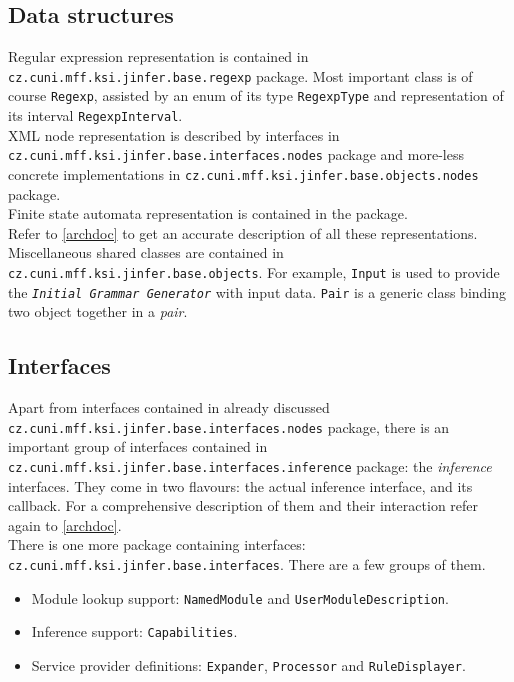 \documentclass[a4paper,10pt,oneside]{article}
\newcommand{\code}[1]{\texttt{#1}}
\newcommand{\jmodule}[1]{\texttt{\textit{#1}}}
\begin{document}
\subsection{Data structures}

Regular expression representation is contained in \code{cz.cuni.mff.ksi.jinfer.base.regexp} package. Most important class is of course \code{Regexp}, assisted by an enum of its type \code{RegexpType} and representation of its interval \code{RegexpInterval}.\\
XML node representation is described by interfaces in \code{cz.cuni.mff.ksi.jinfer.base.interfaces.nodes} package and more-less concrete implementations in \code{cz.cuni.mff.ksi.jinfer.base.objects.nodes} package.\\
Finite state automata representation is contained in the \cite{cz.cuni.mff.ksi.jinfer.base.automaton} package.\\
Refer to \ref{archdoc} to get an accurate description of all these representations.\\

Miscellaneous shared classes are contained in \code{cz.cuni.mff.ksi.jinfer.base.objects}. For example, \code{Input} is used to provide the \jmodule{Initial Grammar Generator} with input data. \code{Pair} is a generic class binding two object together in a \emph{pair}.

\subsection{Interfaces}

Apart from interfaces contained in already discussed \code{cz.cuni.mff.ksi.jinfer.base.interfaces.nodes} package, there is an important group of interfaces contained in \code{cz.cuni.mff.ksi.jinfer.base.interfaces.inference} package: the \emph{inference} interfaces. They come in two flavours: the actual inference interface, and its callback. For a comprehensive description of them and their interaction refer again to \ref{archdoc}.\\

There is one more package containing interfaces: \code{cz.cuni.mff.ksi.jinfer.base.interfaces}. There are a few groups of them.
\begin{itemize}
	\item Module lookup support: \code{NamedModule} and \code{UserModuleDescription}.
	\item Inference support: \code{Capabilities}.
	\item Service provider definitions: \code{Expander}, \code{Processor} and \code{RuleDisplayer}.
\end{itemize}
\end{document}
